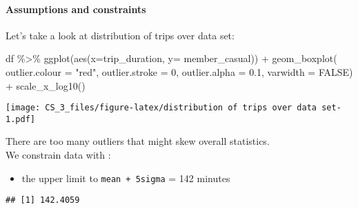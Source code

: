 \documentclass[
]{article}
\newenvironment{Shaded}{\begin{snugshade}}{\end{snugshade}}
\newcommand{\AttributeTok}[1]{\textcolor[rgb]{0.77,0.63,0.00}{#1}}
\newcommand{\ConstantTok}[1]{\textcolor[rgb]{0.00,0.00,0.00}{#1}}
\newcommand{\DecValTok}[1]{\textcolor[rgb]{0.00,0.00,0.81}{#1}}
\newcommand{\FloatTok}[1]{\textcolor[rgb]{0.00,0.00,0.81}{#1}}
\newcommand{\FunctionTok}[1]{\textcolor[rgb]{0.00,0.00,0.00}{#1}}
\newcommand{\NormalTok}[1]{#1}
\newcommand{\OtherTok}[1]{\textcolor[rgb]{0.56,0.35,0.01}{#1}}
\newcommand{\SpecialCharTok}[1]{\textcolor[rgb]{0.00,0.00,0.00}{#1}}
\newcommand{\StringTok}[1]{\textcolor[rgb]{0.31,0.60,0.02}{#1}}
\providecommand{\tightlist}{%
  \setlength{\itemsep}{0pt}\setlength{\parskip}{0pt}}
\begin{document}
\hypertarget{assumptions-and-constraints}{%
\paragraph{Assumptions and
constraints}\label{assumptions-and-constraints}}

Let's take a look at distribution of trips over data set:

\begin{Shaded}
\begin{Highlighting}[]
\NormalTok{df }\SpecialCharTok{\%\textgreater{}\%} 
  \FunctionTok{ggplot}\NormalTok{(}\FunctionTok{aes}\NormalTok{(}\AttributeTok{x=}\NormalTok{trip\_duration, }\AttributeTok{y=}\NormalTok{ member\_casual)) }\SpecialCharTok{+}
  \FunctionTok{geom\_boxplot}\NormalTok{( }\AttributeTok{outlier.colour =} \StringTok{"red"}\NormalTok{,}
                \AttributeTok{outlier.stroke =} \DecValTok{0}\NormalTok{, }
                \AttributeTok{outlier.alpha =} \FloatTok{0.1}\NormalTok{,}
                \AttributeTok{varwidth =} \ConstantTok{FALSE}\NormalTok{) }\SpecialCharTok{+}
  \FunctionTok{scale\_x\_log10}\NormalTok{()}
\end{Highlighting}
\end{Shaded}

\texttt{[image: CS\_3\_files/figure-latex/distribution of trips over data set-1.pdf]}

There are too many outliers that might skew overall statistics.\\

We constrain data with :

\begin{itemize}
\tightlist
\item
  the upper limit to \texttt{mean\ +\ 5sigma} = 142 minutes
\end{itemize}

\begin{Shaded}
\end{Shaded}

\begin{verbatim}
## [1] 142.4059
\end{verbatim}
\end{document}
